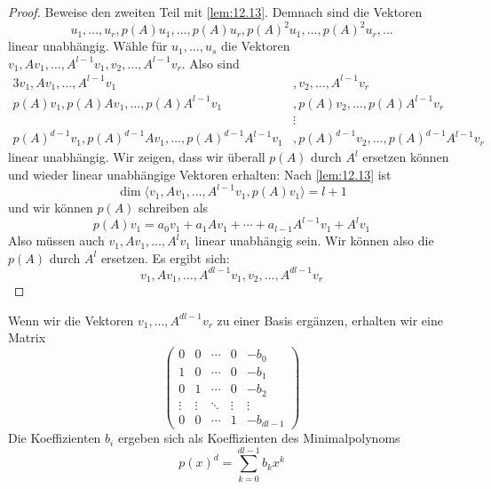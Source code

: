 \documentclass[a4paper, 10pt]{scrbook}
\begin{document}
\begin{lem}
\begin{proof}
		Beweise den zweiten Teil mit \ref{lem:12.13}.
		Demnach sind die Vektoren
		\[
			u_1,\dotsc, u_r,p(A)u_1, \dotsc, p(A)u_r, p(A)^2u_1, \dotsc, p(A)^2u_r, \dotsc
		\]
		linear unabhängig.
		Wähle für $u_1,\dotsc, u_s$ die Vektoren $v_1,Av_1, \dotsc, A^{l-1}v_1,v_2,\dotsc, A^{l-1}v_r$.
		Also sind
		\begin{alignat*}{3}
			v_1, Av_1, \dotsc, A^{l-1}v_1 &, v_2, \dotsc, A^{l-1}v_r\\
			p(A)v_1, p(A)Av_1, \dotsc, p(A)A^{l-1}v_1 &, p(A)v_2, \dotsc, p(A)A^{l-1}v_r\\
										   &\vdots\\
			p(A)^{d-1}v_1, p(A)^{d-1}Av_1, \dotsc, p(A)^{d-1}A^{l-1}v_1 &, p(A)^{d-1}v_2, \dots, p(A)^{d-1}A^{l-1}v_r
		\end{alignat*}
		linear unabhängig.
		Wir zeigen, dass wir überall $p(A)$ durch $A^l$ ersetzen können und wieder linear unabhängige Vektoren erhalten:
		Nach \ref{lem:12.13} ist
		\[
			\dim \langle v_1, Av_1, \dotsc, A^{l-1}v_1, p(A)v_1\rangle = l+1
		\]
		und wir können $p(A)$ schreiben als
		\[
			p(A)v_1 = a_0v_1 + a_1Av_1 + \dotsb + a_{l-1}A^{l-1}v_1 + A^lv_1
		\]
		Also müssen auch $v_1, Av_1, \dotsc, A^{l}v_1$ linear unabhängig sein.
		Wir können also die $p(A)$ durch $A^l$ ersetzen.
		Es ergibt sich:
		\[	
			v_1, Av_1, \dotsc, A^{dl-1}v_1, v_2, \dotsc, A^{dl-1}v_r
		\]
	\end{proof}
\end{lem}

Wenn wir die Vektoren $v_1,\dotsc, A^{dl-1}v_r$ zu einer Basis ergänzen, erhalten wir eine Matrix
\[
	\begin{pmatrix}
		0 & 0 & \cdots & 0 & -b_0 \\
		1& 0 &\cdots & 0 & -b_1 \\
		0& 1 & \cdots & 0 & -b_2 \\
		\vdots & \vdots & \ddots & \vdots & \vdots \\
		0 & 0& \cdots & 1 &  -b_{dl-1}
	\end{pmatrix}
\]
Die Koeffizienten $b_i$ ergeben sich als Koeffizienten des Minimalpolynoms
\[
	p(x)^d = \sum_{k=0}^{dl-1}b_kx^k
\]
\end{document}

